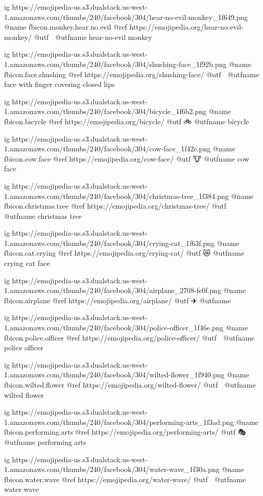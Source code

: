 	ig https://emojipedia-us.s3.dualstack.us-west-1.amazonaws.com/thumbs/240/facebook/304/hear-no-evil-monkey_1f649.png
	@name fbicon.monkey.hear.no.evil
	@ref https://emojipedia.org/hear-no-evil-monkey/
	@utf 🙉
	@utfname hear-no-evil monkey

	ig https://emojipedia-us.s3.dualstack.us-west-1.amazonaws.com/thumbs/240/facebook/304/shushing-face_1f92b.png
	@name fbicon.face.shushing
	@ref https://emojipedia.org/shushing-face/
	@utf 🤫
	@utfname face with finger covering closed lips

	ig https://emojipedia-us.s3.dualstack.us-west-1.amazonaws.com/thumbs/240/facebook/304/bicycle_1f6b2.png
	@name fbicon.bicycle
	@ref https://emojipedia.org/bicycle/
	@utf 🚲
	@utfname bicycle

	ig https://emojipedia-us.s3.dualstack.us-west-1.amazonaws.com/thumbs/240/facebook/304/cow-face_1f42e.png
	@name fbicon.cow.face
	@ref https://emojipedia.org/cow-face/
	@utf 🐮
	@utfname cow face

	ig https://emojipedia-us.s3.dualstack.us-west-1.amazonaws.com/thumbs/240/facebook/304/christmas-tree_1f384.png
	@name fbicon.christmas.tree
	@ref https://emojipedia.org/christmas-tree/
	@utf 🎄
	@utfname christmas tree

	ig https://emojipedia-us.s3.dualstack.us-west-1.amazonaws.com/thumbs/240/facebook/304/crying-cat_1f63f.png
	@name fbicon.cat.crying
	@ref https://emojipedia.org/crying-cat/
	@utf 😿
	@utfname crying cat face

	ig https://emojipedia-us.s3.dualstack.us-west-1.amazonaws.com/thumbs/240/facebook/304/airplane_2708-fe0f.png
	@name fbicon.airplane
	@ref https://emojipedia.org/airplane/
	@utf ✈️
	@utfname

	ig https://emojipedia-us.s3.dualstack.us-west-1.amazonaws.com/thumbs/240/facebook/304/police-officer_1f46e.png
	@name fbicon.police.officer
	@ref https://emojipedia.org/police-officer/
	@utf 👮
	@utfname police officer

	ig https://emojipedia-us.s3.dualstack.us-west-1.amazonaws.com/thumbs/240/facebook/304/wilted-flower_1f940.png
	@name fbicon.wilted.flower
	@ref https://emojipedia.org/wilted-flower/
	@utf 🥀
	@utfname wilted flower

	ig https://emojipedia-us.s3.dualstack.us-west-1.amazonaws.com/thumbs/240/facebook/304/performing-arts_1f3ad.png
	@name fbicon.performing.arts
	@ref https://emojipedia.org/performing-arts/
	@utf 🎭
	@utfname performing arts

	ig https://emojipedia-us.s3.dualstack.us-west-1.amazonaws.com/thumbs/240/facebook/304/water-wave_1f30a.png
	@name fbicon.water.wave
	@ref https://emojipedia.org/water-wave/
	@utf 🌊
	@utfname water wave


